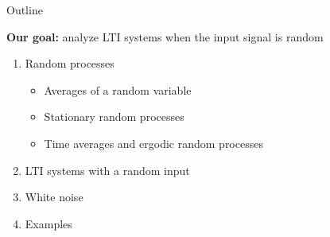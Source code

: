 \documentclass[10pt]{beamer}
\begin{document}
\begin{frame}{Outline}

\textbf{Our goal:} analyze LTI systems when the input signal is random

\begin{enumerate}
	\item Random processes
	\begin{itemize}
		\item Averages of a random variable
		\item Stationary random processes
		\item Time averages and ergodic random processes
	\end{itemize}
	\item LTI systems with a random input
	\item White noise
	\item Examples
\end{enumerate}
\end{frame}

%
\end{document}
